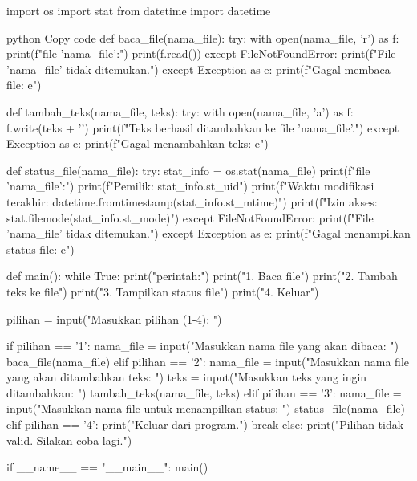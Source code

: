 \documentclass[12pt]{article}
\begin{document}
    \begin{python} import os import stat from datetime import datetime
    
    python
    Copy code
    def baca_file(nama_file):
        try:
            with open(nama_file, 'r') as f:
                print(f"\nIsi file '{nama_file}':")
                print(f.read())
        except FileNotFoundError:
            print(f"File '{nama_file}' tidak ditemukan.")
        except Exception as e:
            print(f"Gagal membaca file: {e}")
    
    def tambah_teks(nama_file, teks):
        try:
            with open(nama_file, 'a') as f:
                f.write(teks + '\n')
            print(f"Teks berhasil ditambahkan ke file '{nama_file}'.")
        except Exception as e:
            print(f"Gagal menambahkan teks: {e}")
    
    def status_file(nama_file):
        try:
            stat_info = os.stat(nama_file)
            print(f"\nStatus file '{nama_file}':")
            print(f"Pemilik: {stat_info.st_uid}")
            print(f"Waktu modifikasi terakhir: {datetime.fromtimestamp(stat_info.st_mtime)}")
            print(f"Izin akses: {stat.filemode(stat_info.st_mode)}")
        except FileNotFoundError:
            print(f"File '{nama_file}' tidak ditemukan.")
        except Exception as e:
            print(f"Gagal menampilkan status file: {e}")
    
    def main():
        while True:
            print("\nPilih perintah:")
            print("1. Baca file")
            print("2. Tambah teks ke file")
            print("3. Tampilkan status file")
            print("4. Keluar")
    
            pilihan = input("Masukkan pilihan (1-4): ")
    
            if pilihan == '1':
                nama_file = input("Masukkan nama file yang akan dibaca: ")
                baca_file(nama_file)
            elif pilihan == '2':
                nama_file = input("Masukkan nama file yang akan ditambahkan teks: ")
                teks = input("Masukkan teks yang ingin ditambahkan: ")
                tambah_teks(nama_file, teks)
            elif pilihan == '3':
                nama_file = input("Masukkan nama file untuk menampilkan status: ")
                status_file(nama_file)
            elif pilihan == '4':
                print("Keluar dari program.")
                break
            else:
                print("Pilihan tidak valid. Silakan coba lagi.")
    
    if __name__ == "__main__":
        main()
    \end{python}
\end{document}
